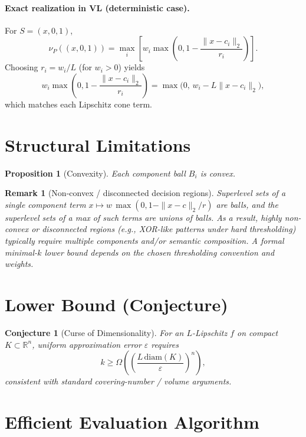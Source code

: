 \documentclass[11pt]{article}
\newtheorem{proposition}{Proposition}
\newtheorem{conjecture}{Conjecture}
\newtheorem{remark}{Remark}
\begin{document}
\paragraph{Exact realization in VL (deterministic case).}
For $S=(x,0,1)$,
\begin{equation}
\nu_P((x,0,1))=\max_i \left[w_i\max\!\left(0,1-\frac{\|x-c_i\|_2}{r_i}\right)\right].
\end{equation}
Choosing $r_i=w_i/L$ (for $w_i>0$) yields
\begin{equation}
w_i\max\!\left(0,1-\frac{\|x-c_i\|_2}{r_i}\right)=\max\big(0,\,w_i-L\|x-c_i\|_2\big),
\end{equation}
which matches each Lipschitz cone term.

\section{Structural Limitations}

\begin{proposition}[Convexity]
Each component ball $B_i$ is convex.
\end{proposition}

\begin{remark}[Non-convex / disconnected decision regions]
Superlevel sets of a single component term $x\mapsto w\,\max(0,1-\|x-c\|_2/r)$ are balls, and the superlevel sets of a max of such terms are unions of balls. As a result, highly non-convex or disconnected regions (e.g., XOR-like patterns under hard thresholding) typically require multiple components and/or semantic composition. A formal minimal-$k$ lower bound depends on the chosen thresholding convention and weights.
\end{remark}

\section{Lower Bound (Conjecture)}

\begin{conjecture}[Curse of Dimensionality]
For an $L$-Lipschitz $f$ on compact $K\subset \mathbb{R}^n$, uniform approximation error $\varepsilon$ requires
\begin{equation}
k\ge \Omega\!\left(\left(\frac{L\,\mathrm{diam}(K)}{\varepsilon}\right)^n\right),
\end{equation}
consistent with standard covering-number / volume arguments.
\end{conjecture}

\section{Efficient Evaluation Algorithm}
\end{document}
